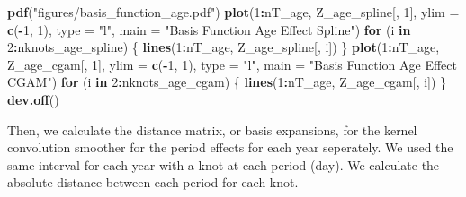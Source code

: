 \documentclass[11pt,]{article}
\newenvironment{Shaded}{\begin{snugshade}}{\end{snugshade}}
\newcommand{\KeywordTok}[1]{\textcolor[rgb]{0.13,0.29,0.53}{\textbf{#1}}}
\newcommand{\DataTypeTok}[1]{\textcolor[rgb]{0.13,0.29,0.53}{#1}}
\newcommand{\DecValTok}[1]{\textcolor[rgb]{0.00,0.00,0.81}{#1}}
\newcommand{\StringTok}[1]{\textcolor[rgb]{0.31,0.60,0.02}{#1}}
\newcommand{\ControlFlowTok}[1]{\textcolor[rgb]{0.13,0.29,0.53}{\textbf{#1}}}
\newcommand{\OperatorTok}[1]{\textcolor[rgb]{0.81,0.36,0.00}{\textbf{#1}}}
\newcommand{\NormalTok}[1]{#1}
\begin{document}
\begin{Shaded}
\begin{Highlighting}[]
\KeywordTok{pdf}\NormalTok{(}\StringTok{"figures/basis_function_age.pdf"}\NormalTok{)}
\KeywordTok{plot}\NormalTok{(}\DecValTok{1}\OperatorTok{:}\NormalTok{nT_age,}
\NormalTok{     Z_age_spline[, }\DecValTok{1}\NormalTok{],}
     \DataTypeTok{ylim =} \KeywordTok{c}\NormalTok{(}\OperatorTok{-}\DecValTok{1}\NormalTok{, }\DecValTok{1}\NormalTok{),}
     \DataTypeTok{type =} \StringTok{"l"}\NormalTok{,}
     \DataTypeTok{main =} \StringTok{"Basis Function Age Effect Spline"}\NormalTok{)}
\ControlFlowTok{for}\NormalTok{ (i }\ControlFlowTok{in} \DecValTok{2}\OperatorTok{:}\NormalTok{nknots_age_spline) \{}
  \KeywordTok{lines}\NormalTok{(}\DecValTok{1}\OperatorTok{:}\NormalTok{nT_age, Z_age_spline[, i])}
\NormalTok{\}}
\KeywordTok{plot}\NormalTok{(}\DecValTok{1}\OperatorTok{:}\NormalTok{nT_age,}
\NormalTok{     Z_age_cgam[, }\DecValTok{1}\NormalTok{],}
     \DataTypeTok{ylim =} \KeywordTok{c}\NormalTok{(}\OperatorTok{-}\DecValTok{1}\NormalTok{, }\DecValTok{1}\NormalTok{),}
     \DataTypeTok{type =} \StringTok{"l"}\NormalTok{,}
     \DataTypeTok{main =} \StringTok{"Basis Function Age Effect CGAM"}\NormalTok{)}
\ControlFlowTok{for}\NormalTok{ (i }\ControlFlowTok{in} \DecValTok{2}\OperatorTok{:}\NormalTok{nknots_age_cgam) \{}
  \KeywordTok{lines}\NormalTok{(}\DecValTok{1}\OperatorTok{:}\NormalTok{nT_age, Z_age_cgam[, i])}
\NormalTok{\}}
\KeywordTok{dev.off}\NormalTok{()}
\end{Highlighting}
\end{Shaded}

Then, we calculate the distance matrix, or basis expansions, for the
kernel convolution smoother for the period effects for each year
seperately. We used the same interval for each year with a knot at each
period (day). We calculate the absolute distance between each period for
each knot.
\end{document}
